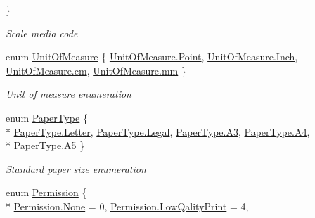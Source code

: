\begin{DoxyCompactItemize}
 \}\begin{DoxyCompactList}\small\item\em Scale media code \end{DoxyCompactList}
\item 
enum \hyperlink{namespace_pdf_file_writer_a07c9a86b1844a70efb1eb148377dde65}{Unit\+Of\+Measure} \{ \hyperlink{namespace_pdf_file_writer_a07c9a86b1844a70efb1eb148377dde65a2a3cd5946cfd317eb99c3d32e35e2d4c}{Unit\+Of\+Measure.\+Point}, 
\hyperlink{namespace_pdf_file_writer_a07c9a86b1844a70efb1eb148377dde65abee12d309ba5730e1e121733b7b67956}{Unit\+Of\+Measure.\+Inch}, 
\hyperlink{namespace_pdf_file_writer_a07c9a86b1844a70efb1eb148377dde65a820eb5b696ea2a657c0db1e258dc7d81}{Unit\+Of\+Measure.\+cm}, 
\hyperlink{namespace_pdf_file_writer_a07c9a86b1844a70efb1eb148377dde65ab3cd915d758008bd19d0f2428fbb354a}{Unit\+Of\+Measure.\+mm}
 \}\begin{DoxyCompactList}\small\item\em Unit of measure enumeration \end{DoxyCompactList}
\item 
enum \hyperlink{namespace_pdf_file_writer_a75284a02a7aac96778d2e1f95f406dfb}{Paper\+Type} \{ \\*
\hyperlink{namespace_pdf_file_writer_a75284a02a7aac96778d2e1f95f406dfba17a53d1a012580ef609b70ef6a25d1f1}{Paper\+Type.\+Letter}, 
\hyperlink{namespace_pdf_file_writer_a75284a02a7aac96778d2e1f95f406dfbaa10a9bcd450087de1ce1f80b35f44883}{Paper\+Type.\+Legal}, 
\hyperlink{namespace_pdf_file_writer_a75284a02a7aac96778d2e1f95f406dfba6593d7b12fd418cdb35bbf438de72f66}{Paper\+Type.\+A3}, 
\hyperlink{namespace_pdf_file_writer_a75284a02a7aac96778d2e1f95f406dfba0c2f3adf2a48bab3adb470f4da57f3d0}{Paper\+Type.\+A4}, 
\\*
\hyperlink{namespace_pdf_file_writer_a75284a02a7aac96778d2e1f95f406dfbac6f2f93133905f75da4b02ccc19ab66a}{Paper\+Type.\+A5}
 \}\begin{DoxyCompactList}\small\item\em Standard paper size enumeration \end{DoxyCompactList}
\item 
enum \hyperlink{namespace_pdf_file_writer_a10f216f5352bb45a6ed502a96ccdf5d7}{Permission} \{ \\*
\hyperlink{namespace_pdf_file_writer_a10f216f5352bb45a6ed502a96ccdf5d7a6adf97f83acf6453d4a6a4b1070f3754}{Permission.\+None} = 0, 
\hyperlink{namespace_pdf_file_writer_a10f216f5352bb45a6ed502a96ccdf5d7aa1ff6b8788f410268834050d367f6220}{Permission.\+Low\+Qality\+Print} = 4, 

\end{DoxyCompactItemize}
